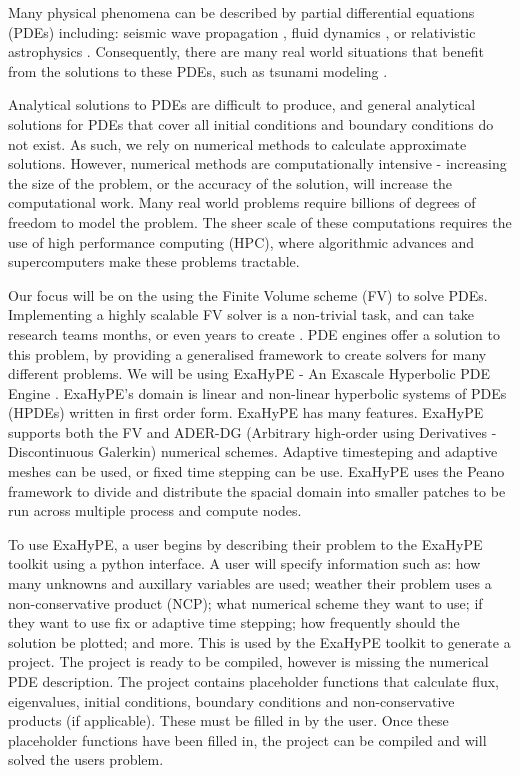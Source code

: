 Many physical phenomena can be described by partial differential equations (PDEs) including:  seismic wave propagation \cite{earthquakePDE}, fluid dynamics \cite{exahype}, or relativistic astrophysics \cite{relativisticPDE}.
Consequently, there are many real world situations that benefit from the solutions to these PDEs, such as tsunami modeling \cite{tsunamiPDE}.


Analytical solutions to PDEs are difficult to produce, and general analytical solutions for PDEs that cover all initial conditions and boundary conditions do not exist.
As such, we rely on numerical methods to calculate approximate solutions.
However, numerical methods are computationally intensive - increasing the size of the problem, or the accuracy of the solution, will increase the computational work.
Many real world problems require billions of degrees of freedom to model the problem.
The sheer scale of these computations requires the use of high performance computing (HPC), where algorithmic advances and supercomputers make these problems tractable.

Our focus will be on the using the Finite Volume scheme (FV) to solve PDEs.
Implementing a highly scalable FV solver is a non-trivial task, and can take research teams months, or even years to create \cite{tensorChemistry}.
PDE engines offer a solution to this problem, by providing a generalised framework to create solvers for many different problems.
We will be using ExaHyPE - An Exascale Hyperbolic PDE Engine \cite{exahype}.
ExaHyPE's domain is linear and non-linear hyperbolic systems of PDEs (HPDEs) written in first order form.
ExaHyPE has many features.
ExaHyPE supports both the FV and ADER-DG (Arbitrary high-order using Derivatives - Discontinuous Galerkin) numerical schemes.
Adaptive timesteping and adaptive meshes can be used, or fixed time stepping can be use. 
ExaHyPE uses the Peano framework \cite{PeanoFramework} to divide and distribute the spacial domain into smaller patches to be run across multiple process and compute nodes.

To use ExaHyPE, a user begins by describing their problem to the ExaHyPE toolkit using a python interface.
A user will specify information such as: how many unknowns and auxillary variables are used; weather their problem uses a non-conservative product (NCP); what numerical scheme they want to use; if they want to use fix or adaptive time stepping; how frequently should the solution be plotted; and more.
This is used by the ExaHyPE toolkit to generate a project.
The project is ready to be compiled, however is missing the numerical PDE description.
The project contains placeholder functions that calculate flux, eigenvalues, initial conditions, boundary conditions and non-conservative products (if applicable).   
These must be filled in by the user.
Once these placeholder functions have been filled in, the project can be compiled and will solved the users problem.


